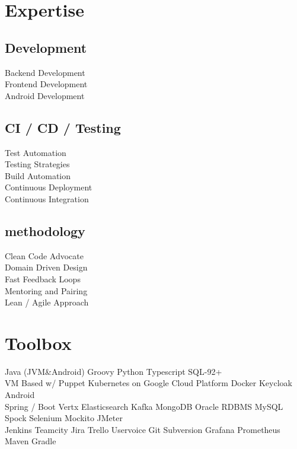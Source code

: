 \documentclass[]{resume}
\begin{document}
\begin{minipage}[t]{0.32\textwidth}

\section{Expertise}
\subsection{Development}
Backend Development \\
Frontend Development \\
Android Development \\
\sectionsep

\subsection{CI / CD / Testing}
Test Automation \\
Testing Strategies \\
Build Automation \\
Continuous Deployment \\
Continuous Integration \\
\sectionsep

\subsection{methodology}
Clean Code Advocate \\
Domain Driven Design \\
Fast Feedback Loops \\
Mentoring and Pairing \\
Lean / Agile Approach \\
\sectionsep


\section{Toolbox}
Java (JVM\&Android) \textbullet{} Groovy \textbullet{} Python
\textbullet{} Typescript \textbullet{} SQL-92+\\
VM Based w/ Puppet \textbullet{} Kubernetes on Google Cloud Platform \textbullet{} Docker \textbullet{} Keycloak \textbullet{} Android\\
Spring / Boot \textbullet{} Vertx \textbullet{} Elasticsearch \textbullet{} Kafka \textbullet{} MongoDB \textbullet{} Oracle RDBMS \textbullet{} MySQL\\
Spock \textbullet{} Selenium \textbullet{} Mockito \textbullet{} JMeter\\
Jenkins \textbullet{} Teamcity \textbullet{} Jira \textbullet{} Trello
\textbullet{} Uservoice \textbullet{} Git \textbullet{} Subversion  \textbullet{} Grafana \textbullet{} Prometheus \textbullet{} Maven 
\textbullet{} Gradle \\
\sectionsep


\end{minipage}
\end{document}
